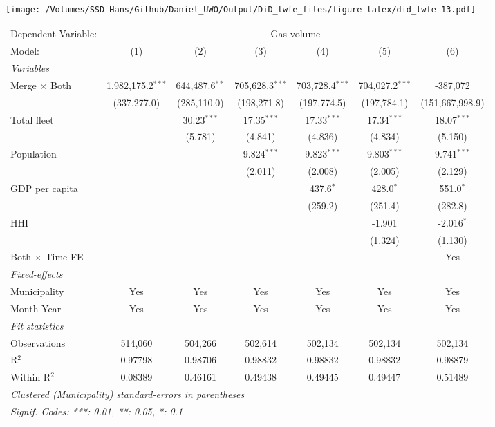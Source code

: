\documentclass[
]{article}
\begin{document}
\texttt{[image: /Volumes/SSD Hans/Github/Daniel\_UWO/Output/DiD\_twfe\_files/figure-latex/did\_twfe-13.pdf]}

\begin{tabular}{lcccccc}
\tabularnewline\midrule\midrule
Dependent Variable:&\multicolumn{6}{c}{Gas volume}\\
Model:&(1) & (2) & (3) & (4) & (5) & (6)\\
\midrule \emph{Variables}&   &   &   &   &   &  \\
Merge $\times $ Both & 1,982,175.2$^{***}$ & 644,487.6$^{**}$ & 705,628.3$^{***}$ & 703,728.4$^{***}$ & 704,027.2$^{***}$ & -387,072\\
  &(337,277.0) & (285,110.0) & (198,271.8) & (197,774.5) & (197,784.1) & (151,667,998.9)\\
Total fleet &    & 30.23$^{***}$ & 17.35$^{***}$ & 17.33$^{***}$ & 17.34$^{***}$ & 18.07$^{***}$\\
  &   & (5.781) & (4.841) & (4.836) & (4.834) & (5.150)\\
Population &    &    & 9.824$^{***}$ & 9.823$^{***}$ & 9.803$^{***}$ & 9.741$^{***}$\\
  &   &    & (2.011) & (2.008) & (2.005) & (2.129)\\
GDP per capita &    &    &    & 437.6$^{*}$ & 428.0$^{*}$ & 551.0$^{*}$\\
  &   &    &    & (259.2) & (251.4) & (282.8)\\
HHI &    &    &    &    & -1.901 & -2.016$^{*}$\\
  &   &    &    &    & (1.324) & (1.130)\\
Both $\times$ Time FE &  &  &  &  &  & Yes\\
\midrule \emph{Fixed-effects}&   &   &   &   &   &  \\
Municipality & Yes & Yes & Yes & Yes & Yes & Yes\\
Month-Year & Yes & Yes & Yes & Yes & Yes & Yes\\
\midrule \emph{Fit statistics}&  & & & & & \\
Observations & 514,060&504,266&502,614&502,134&502,134&502,134\\
R$^2$ & 0.97798&0.98706&0.98832&0.98832&0.98832&0.98879\\
Within R$^2$ & 0.08389&0.46161&0.49438&0.49445&0.49447&0.51489\\
\midrule\midrule\multicolumn{7}{l}{\emph{Clustered (Municipality) standard-errors in parentheses}}\\
\multicolumn{7}{l}{\emph{Signif. Codes: ***: 0.01, **: 0.05, *: 0.1}}\\
\end{tabular}
\end{document}
